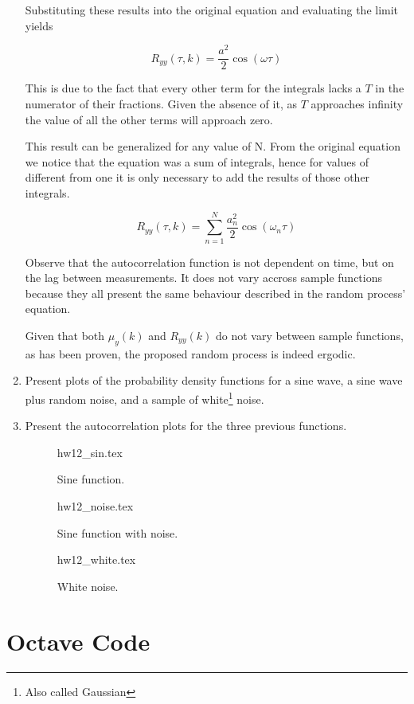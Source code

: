 \documentclass[a4paper,12pt]{article}
\begin{document}
\begin{enumerate}
Substituting these results into the original equation and evaluating the limit yields

\begin{equation*}
 R_{yy} (\tau, k) =  \frac{a^2}{2} \cos(\omega \tau)
\end{equation*}

This is due to the fact that every other term for the integrals lacks a $T$ in the numerator of their fractions.
Given the absence of it, as $T$ approaches infinity the value of all the other terms will approach zero.

This result can be generalized for any value of N.
From the original equation we notice that the equation was a sum of integrals, hence for values of different from one it is only necessary to add the results of those other integrals.

\begin{equation*}
 R_{yy} (\tau, k) =  \sum_{n=1}^N \frac{a_n^2}{2} \cos(\omega_n \tau)
\end{equation*}

Observe that the autocorrelation function is not dependent on time, but on the lag between measurements.
It does not vary accross sample functions because they all present the same behaviour described in the random process' equation.

Given that both $\mu_y (k)$ and $R_{yy}(k)$ do not vary between sample functions, as has been proven, the proposed random process is indeed ergodic.



\item Present plots of the probability density functions for a sine wave, a sine wave plus random noise, and a sample of white\footnote{Also called Gaussian} noise.

\item Present the autocorrelation plots for the three previous functions.

\begin{figure}[htb!]
\centering
{hw12_sin.tex}
\caption{Sine function.}
\label{fig: sin}
\end{figure}

\newpage
\pagebreak

\begin{figure}[htb!]
\centering
{hw12_noise.tex}
\caption{Sine function with noise.}
\label{fig: noise}
\end{figure}

\newpage
\pagebreak

\begin{figure}[htb!]
\centering
{hw12_white.tex}
\caption{White noise.}
\label{fig: white}
\end{figure}

\end{enumerate}



\printbibliography

\newpage
\pagebreak
\appendix
\section{Octave Code}


\end{document}
